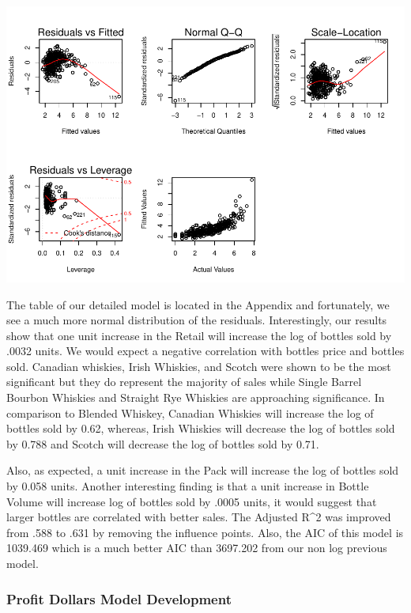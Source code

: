 \documentclass[]{elsarticle} %
\makeatletter
\def\maxwidth{\ifdim\Gin@nat@width>\linewidth\linewidth
\else\Gin@nat@width\fi}
\let\Oldincludegraphics\includegraphics
\renewcommand{\includegraphics}[1]{\Oldincludegraphics[width=\maxwidth]{#1}}
\makeatother
\begin{document}
\includegraphics{Final_Project_files/figure-latex/unnamed-chunk-16-1.pdf}

\bigskip

The table of our detailed model is located in the Appendix and
fortunately, we see a much more normal distribution of the residuals.
Interestingly, our results show that one unit increase in the Retail
will increase the log of bottles sold by .0032 units. We would expect a
negative correlation with bottles price and bottles sold. Canadian
whiskies, Irish Whiskies, and Scotch were shown to be the most
significant but they do represent the majority of sales while Single
Barrel Bourbon Whiskies and Straight Rye Whiskies are approaching
significance. In comparison to Blended Whiskey, Canadian Whiskies will
increase the log of bottles sold by 0.62, whereas, Irish Whiskies will
decrease the log of bottles sold by 0.788 and Scotch will decrease the
log of bottles sold by 0.71.

Also, as expected, a unit increase in the Pack will increase the log of
bottles sold by 0.058 units. Another interesting finding is that a unit
increase in Bottle Volume will increase log of bottles sold by .0005
units, it would suggest that larger bottles are correlated with better
sales. The Adjusted R\^{}2 was improved from .588 to .631 by removing
the influence points. Also, the AIC of this model is 1039.469 which is a
much better AIC than 3697.202 from our non log previous model.

\newpage

\subsubsection{Profit Dollars Model
Development}\label{profit-dollars-model-development}
\end{document}
